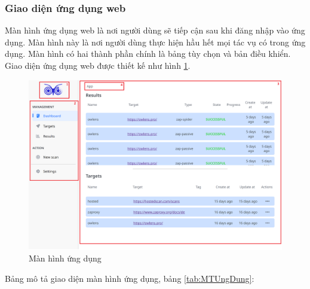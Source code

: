 \subsubsection{Giao diện ứng dụng web}

\tab Màn hình ứng dụng web là nơi người dùng sẽ tiếp cận sau khi đăng nhập vào ứng dụng.
Màn hình này là nơi người dùng thực hiện hầu hết mọi tác vụ có trong ứng dụng.
Màn hình có hai thành phần chính là bảng tùy chọn và bản điều khiển.
Giao diện ứng dụng web được thiết kế như hình \ref{fig:MHUngDung}.

\begin{figure}[H]
      \centering
      \includegraphics[width=\textwidth]{applied-thesis-chapters/chapter-3/Màn hình ứng dụng.png}
      \caption{Màn hình ứng dụng}
      \label{fig:MHUngDung}
\end{figure}

Bảng mô tả giao diện màn hình ứng dụng, bảng \ref{tab:MTUngDung}:

